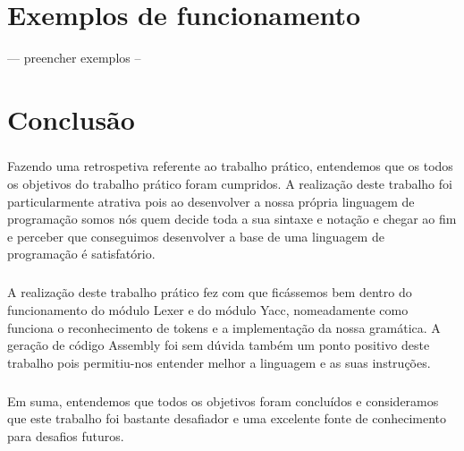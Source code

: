 \documentclass[11pt,a4paper]{report}
\begin{document}
 
    \chapter{Exemplos de funcionamento}
    --- preencher exemplos -- 
    

\chapter{Conclusão}
\paragraph{}
Fazendo uma retrospetiva referente ao trabalho prático, entendemos que os todos os objetivos do trabalho prático foram cumpridos. A realização deste trabalho foi particularmente atrativa pois ao desenvolver a nossa própria linguagem de programação somos nós quem decide toda a sua sintaxe e notação e chegar ao fim e perceber que conseguimos desenvolver a base de uma linguagem de programação é satisfatório.
\paragraph{}
A realização deste trabalho prático fez com que ficássemos bem dentro do funcionamento do módulo Lexer e do módulo Yacc, nomeadamente como funciona o reconhecimento de tokens e a implementação da nossa gramática. A geração de código Assembly foi sem dúvida também um ponto positivo deste trabalho pois permitiu-nos entender melhor a linguagem e as suas instruções. 
\paragraph{}
Em suma, entendemos que todos os objetivos foram concluídos e consideramos que este trabalho foi bastante desafiador e uma excelente fonte de conhecimento para desafios futuros. 
\end{document}
